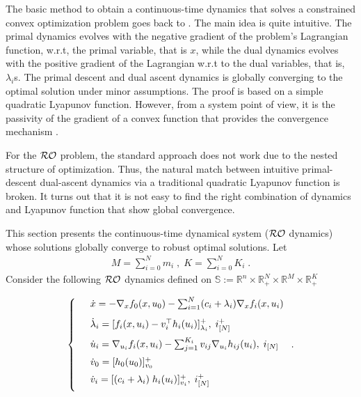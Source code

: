 \documentclass[journal,twoside,web]{ieeecolor}
\begin{document}
The basic method to obtain a continuous-time dynamics that solves a constrained convex optimization problem goes back to \cite{arrow1958}. The main idea is quite intuitive. The primal dynamics evolves with the negative gradient of the problem's Lagrangian function, w.r.t, the primal variable, that is $x$, while the dual dynamics evolves with the positive gradient of the Lagrangian w.r.t to the dual variables, that is, $\lambda_i$s. The primal descent and dual ascent dynamics is globally converging to the optimal solution under minor assumptions. The proof is based on a simple quadratic Lyapunov function. However, from a system point of view, it is the passivity of the gradient of a convex function that provides the convergence mechanism \cite{simpson2016,kosaraju2018}.

For the ${\cal RO}$ problem, the standard approach does not work due to the nested structure of optimization. Thus, the natural match between intuitive primal-descent dual-ascent dynamics via a traditional quadratic Lyapunov function is broken. It turns out that it is not easy to find the right combination of dynamics and Lyapunov function that show global convergence.

This section presents the continuous-time dynamical system (${\cal RO}$ dynamics) whose solutions globally converge to robust optimal solutions. Let
\begin{align*}
M=\sum_{i=0}^{N}m_i\;,\; K=\sum_{i=0}^{N}K_i\;.
\end{align*}
Consider the following ${\cal RO}$ dynamics defined on $\mathbb{S}:= \mathbb{R}^n \times \mathbb{R}^N_{+} \times \mathbb{R}^M \times \mathbb{R}^K_+$\;

\begin{align} \label{pd_dynamics}
\left\{
\begin{array}{cl}
\vspace{3mm}
&\dot x=-\nabla_x f_0(x,u_0)-  \sum_{i=1}^N(c_i+\lambda_i) \nabla_x f_i(x,u_i)\\
\vspace{2mm}
&\dot \lambda_i=[f_i(x,u_i)-v_i^\top h_i(u_i)]_{\lambda_i}^+,\; i^+_{[N]}\\
\vspace{2mm}
&\dot u_i=\nabla_{u_i}f_i(x,u_i)-  \sum_{j=1}^{K_i} v_{ij} \nabla_{u_i} h_{ij}(u_i),\; i_{[N]}\\
\vspace{2mm}
&\dot{v}_0=[h_0(u_0)]_{v_0}^+\\
\vspace{2mm}
&\dot v_i=[(c_i+\lambda_i) \; h_i(u_i)]_{v_i}^+,\;i^+_{[N]}
\end{array}\right..
\end{align}
\end{document}
